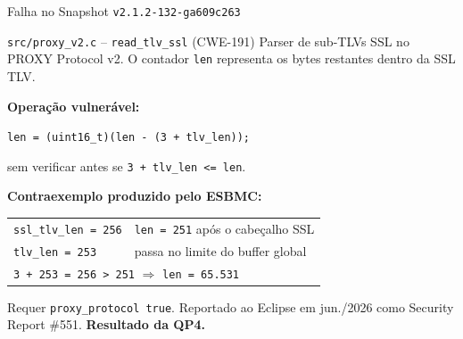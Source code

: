 \documentclass[10pt,aspectratio=169]{beamer}
\newcommand{\mosqversion}{\texttt{v2.1.2-132-ga609c263}}
\begin{document}
\begin{frame}{Falha no Snapshot \mosqversion}
    \begin{block}{\texttt{src/proxy\_v2.c} -- \texttt{read\_tlv\_ssl} (CWE-191)}
        Parser de sub-TLVs SSL no PROXY Protocol v2. O contador \texttt{len}
        representa os bytes restantes dentro da SSL TLV.
    \end{block}

    \vspace{0.3em}
    \textbf{Opera\c{c}\~ao vulner\'avel:}
    \begin{center}
        \texttt{len = (uint16\_t)(len - (3 + tlv\_len));}
    \end{center}
    sem verificar antes se \texttt{3 + tlv\_len <= len}.

    \vspace{0.5em}
    \textbf{Contraexemplo produzido pelo ESBMC:}
    \begin{tabular}{ll}
        \texttt{ssl\_tlv\_len = 256} & \texttt{len = 251} ap\'os o cabe\c{c}alho SSL \\
        \texttt{tlv\_len = 253} & passa no limite do buffer global \\
        \multicolumn{2}{l}{\texttt{3 + 253 = 256 > 251} $\Rightarrow$ \texttt{len = 65.531}} \\
    \end{tabular}

    \vspace{0.4em}
    \footnotesize Requer \texttt{proxy\_protocol true}. Reportado ao Eclipse em
    jun./2026 como Security Report \#551. \textbf{Resultado da QP4.}
\end{frame}
\end{document}
